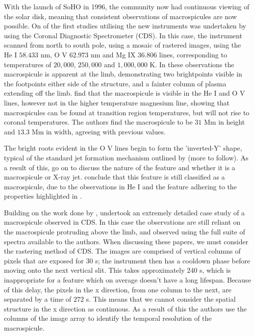With the launch of SoHO in 1996, the community now had continuous viewing of the solar disk, meaning that consistent observations of macrospicules are now possible.
On of the first studies utilising the new instruments was undertaken by \cite{Pike1997} using the Coronal Diagnostic Spectrometer (CDS).
In this case, the instrument scanned from north to south pole, using a mosaic of rastered images, using the He I $58.433$ nm, O V $62.973$ nm and Mg IX $36.806$ lines, corresponding to temperatures of $20,000$, $250,000$ and $1,000,000$ K.
In these observations the macrospicule is apparent at the limb, demonstrating two brightpoints visible in the footpoints either side of the structure, and a fainter column of plasma extending off the limb.
\cite{Pike1997} find that the macrospicule is visible in the He I and O V lines, however not in the higher temperature magnesium line, showing that macrospicules can be found at transition region temperatures, but will not rise to coronal temperatures.
The authors find the macrospicule to be $31$ Mm in height and $13.3$ Mm in width, agreeing with previous values.

The bright roots evident in the O V lines begin to form the 'inverted-Y' shape, typical of the standard jet formation mechanism outlined by \cite{Shibata1992} (more to follow).
As a result of this, \cite{Pike1997} go on to discuss the nature of the feature and whether it is a macrospicule or X-ray jet.
\cite{Pike1997} conclude that this feature is still classified as a macrospicule, due to the observations in He I and the feature adhering to the properties highlighted in \cite{Bohlin1975}.

Building on the work done by \cite{Pike1997}, \cite{Parenti2002} undertook an extremely detailed case study of a macrospicule observed in CDS.
In this case the observations are still reliant on the macrospicule protruding above the limb, and observed using the full suite of spectra available to the authors.
When discussing these papers, we must consider the rastering method of CDS.
The images are comprised of vertical columns of pixels that are exposed for $30 $ s; the instrument then has a cooldown phase before moving onto the next vertical slit.
This takes approximately $240$ s, which is inappropriate for a feature which on average doesn't have a long lifespan.
Because of this delay, the pixels in the x direction, from one column to the next, are separated by a time of $272$ s.
This means that we cannot consider the spatial structure in the x direction as continuous.
As a result of this the authors use the columns of the image array to identify the temporal resolution of the macrospicule. 

